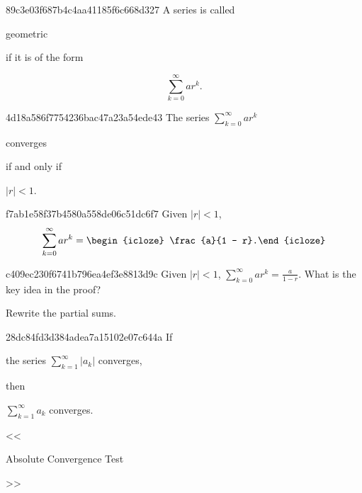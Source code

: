 \begin{note}{89c3e03f687b4c4aa41185f6c668d327}
    A series is called \begin{icloze}{2}geometric\end{icloze} if it is of the form
    \begin{icloze}{1}
        \[
            \sum_{k=0}^{\infty} ar^{k}.
        \]
    \end{icloze}
\end{note}

\begin{note}{4d18a586f7754236bac47a23a54ede43}
    The series \({ \sum_{k=0}^{\infty} ar^{k} }\) \begin{icloze}{2}converges\end{icloze} \begin{icloze}{3}if and only if\end{icloze} \begin{icloze}{1}\({ \left\lvert r \right\rvert < 1 }\).\end{icloze}
\end{note}

\begin{note}{f7ab1e58f37b4580a558de06c51dc6f7}
    Given \({ \left\lvert r \right\rvert < 1 }\),
    \[
        \sum_{k=0}^{\infty} ar^{k} = \begin{icloze}{1}\frac{a}{1 - r}.\end{icloze}
    \]
\end{note}

\begin{note}{c409ec230f6741b796ea4ef3e8813d9c}
    Given \({ \left\lvert r \right\rvert < 1 }\), \({ \sum_{k=0}^{\infty} ar^{k} = \frac{a}{1 - r} }\).
    What is the key idea in the proof?

    \begin{cloze}{1}
        Rewrite the partial sums.
    \end{cloze}
\end{note}

\begin{note}{28dc84fd3d384adea7a15102e07c644a}
    If \begin{icloze}{2}the series \({ \sum_{k=1}^{\infty} \left\lvert a_k \right\rvert }\) converges,\end{icloze} then \begin{icloze}{1}\({ \sum_{k=1}^{\infty} a_k }\) converges.\end{icloze}

    \begin{center}
        \tiny
        <<\begin{icloze}{3}Absolute Convergence Test\end{icloze}>>
    \end{center}
\end{note}

